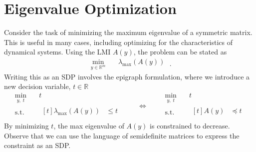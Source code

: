 \documentclass[a4paper]{article}
\begin{document}
\section*{Eigenvalue Optimization}
Consider the task of minimizing the maximum eigenvalue of a symmetric matrix.
This is useful in many cases, including optimizing for the characteristics of dynamical systems.
Using the LMI $A(y)$, the problem can be stated as
\begin{equation*}
\begin{split}
\min_{y\in\mathbb{R}^m}  \quad & \lambda_{\max}(A(y))
\end{split}\;.
\end{equation*}
Writing this as an SDP involves the epigraph formulation, where we introduce a new decision variable, $t\in\mathbb{R}$
\begin{equation*}
\begin{split}
\min_{y,\;t}   \quad & t \\
\textrm{s.t.} \quad &
  \begin{aligned}[t]
    \lambda_{\max}(A(y)) &\le t\\
  \end{aligned}
\end{split}
\qquad\iff\qquad
\begin{split}
\min_{y,\;t}   \quad & t \\
\textrm{s.t.} \quad &
  \begin{aligned}[t]
    A(y) &\preceq t\\
  \end{aligned}
\end{split}
\end{equation*}
By minimizing $t$, the max eigenvalue of $A(y)$ is constrained to decrease.
Observe that we can use the language of semidefinite matrices to express the constraint as an SDP.
\end{document}
